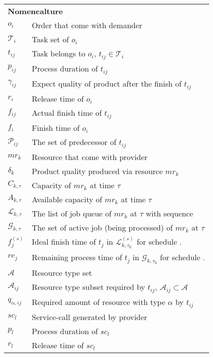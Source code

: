 \begin{table}[htbp]
  \scriptsize
\begin{tabularx}{\textwidth}{|lX|}
    \hline
    \multicolumn{2}{|l|}{\multirow{2}[0]{*}{\textbf{Nomencalture}}} \\
    \multicolumn{2}{|l|}{} \\
	$o_i$ & Order that come with demander \\
	$\mathcal{T}_i$ & Task set of $o_i$ \\
	$t_{ij}$ & Task belongs to $o_i$, $t_{ij}\in\mathcal{T}_i$ \\
	$p_{ij}$ & Process duration of $t_{ij}$\\
	$\gamma_{ij}$ & Expect quality of product after the finish of $t_{ij}$\\
	$r_i$ & Release time of $o_i$\\
	$f_{ij}$ & Actual finish time of $t_{ij}$ \\
	$f_{i}$ & Finish time of $o_i$\\
	$\mathcal{P}_{ij}$ & The set of predecessor of $t_{ij}$\\
	$mr_k$ & Resource that come with provider \\
	$\delta_k$ & Product quality produced via resource $mr_k$ \\
	$C_{k,\tau}$ & Capacity of $mr_k$ at time $\tau$\\
	$A_{k,\tau}$ & Available capacity of $mr_k$ at time $\tau$\\
	$\mathcal{L}_{k,\tau}$ & The list of job queue of $mr_k$ at $\tau$ with sequence\\
	$\mathcal{G}_{k,\tau}$ & The set of active job (being processed) of $mr_k$ at $\tau$ \\ 
	$f^{(s)}_j$ & Ideal finish time of $t_j$ in $\mathcal{L}^{(s)}_{k,\tau_0}$ for schedule . \\
	$re_j$ & Remaining process time of $t_j$ in $\mathcal{G}_{k,\tau_0}$ for schedule . \\
	$\mathcal{A}$ & Resource type set \\
	$\mathcal{A}_{ij}$ & Resource type subset required by $t_{ij}$, $\mathcal{A}_{ij}\subset\mathcal{A}$\\
	$q_{\alpha,ij}$ & Required amount of resource with type $\alpha$ by $t_{ij}$\\
	$sc_l$ & Service-call generated by provider\\
	$p_l$ & Process duration of $sc_l$\\
	$r_l$ & Release time of $sc_l$\\

\end{tabularx}
\end{table}
